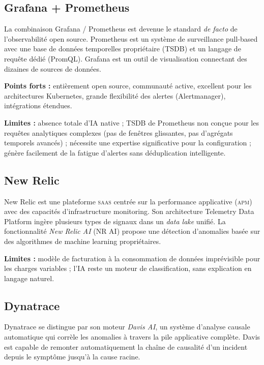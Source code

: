\subsection{Grafana + Prometheus}

La combinaison Grafana / Prometheus est devenue le standard \textit{de facto}
de l'observabilité open source. Prometheus \cite{timescaledb2017} est un système
de surveillance pull-based avec une base de données temporelles propriétaire
(TSDB) et un langage de requête dédié (PromQL). Grafana est un outil de
visualisation connectant des dizaines de sources de données.

\textbf{Points forts :} entièrement open source, communauté active, excellent
pour les architectures Kubernetes, grande flexibilité des alertes
(Alertmanager), intégrations étendues.

\textbf{Limites :} absence totale d'IA native ; TSDB de Prometheus non conçue
pour les requêtes analytiques complexes (pas de fenêtres glissantes, pas
d'agrégats temporels avancés) ; nécessite une expertise significative pour la
configuration ; génère facilement de la fatigue d'alertes sans déduplication
intelligente.

\subsection{New Relic}

New Relic est une plateforme \textsc{saas} centrée sur la performance applicative
(\textsc{apm}) avec des capacités d'infrastructure monitoring. Son architecture
Telemetry Data Platform ingère plusieurs types de signaux dans un \textit{data lake}
unifié. La fonctionnalité \textit{New Relic AI} (NR AI) propose une détection
d'anomalies basée sur des algorithmes de machine learning propriétaires.

\textbf{Limites :} modèle de facturation à la consommation de données imprévisible
pour les charges variables ; l'IA reste un moteur de classification, sans
explication en langage naturel.

\subsection{Dynatrace}

Dynatrace se distingue par son moteur \textit{Davis AI}, un système d'analyse
causale automatique qui corrèle les anomalies à travers la pile applicative
complète. Davis est capable de remonter automatiquement la chaîne de causalité
d'un incident depuis le symptôme jusqu'à la cause racine.

